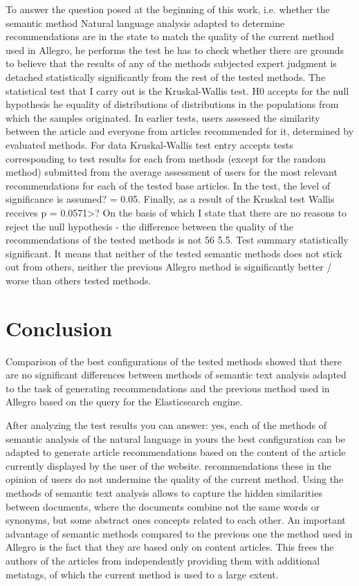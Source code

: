 \documentclass[twoside,twocolumn]{article}
\begin{document}
	To answer the question posed at the beginning of this work, i.e. whether the semantic method
	Natural language analysis adapted to determine recommendations are in the state
	to match the quality of the current method used in Allegro, he performs the test he has
	to check whether there are grounds to believe that the results of any of the methods subjected
	expert judgment is detached statistically significantly from the rest of the tested methods.
	The statistical test that I carry out is the Kruskal-Wallis test. H0 accepts for the null hypothesis
	he equality of distributions of distributions in the populations from which the samples originated.
	In earlier tests, users assessed the similarity between the article and everyone
	from articles recommended for it, determined by evaluated methods. For data
	Kruskal-Wallis test entry accepts tests corresponding to test results for each
	from methods (except for the random method) submitted from the average assessment of users for the most relevant
	recommendations for each of the tested base articles.
	In the test, the level of significance is assumed? = 0.05. Finally, as a result of the Kruskal test
	Wallis receives p = 0.0571>? On the basis of which I state that there are no reasons to
	reject the null hypothesis - the difference between the quality of the recommendations of the tested methods is not
	56
	5.5. Test summary
	statistically significant. It means that neither of the tested semantic methods does not stick out
	from others, neither the previous Allegro method is significantly better / worse than others
	tested methods.
	
	
	\section{Conclusion}
	
	
	Comparison of the best configurations of the tested methods showed that there are no significant differences
	between methods of semantic text analysis adapted to the task of generating recommendations
	and the previous method used in Allegro based on the query for the Elasticsearch engine.
	
	
	After analyzing the test results
	you can answer: yes, each of the methods of semantic analysis of the natural language in yours
	the best configuration can be adapted to generate article recommendations
	based on the content of the article currently displayed by the user of the website. recommendations
	these in the opinion of users do not undermine the quality of the current method.
	Using the methods of semantic text analysis allows to capture the hidden similarities between
	documents, where the documents combine not the same words or synonyms, but some abstract ones
	concepts related to each other. An important advantage of semantic methods compared to the previous one
	the method used in Allegro is the fact that they are based only on content
	articles. This frees the authors of the articles from independently providing them with additional metatags,
	of which the current method is used to a large extent.
	
\end{document}
